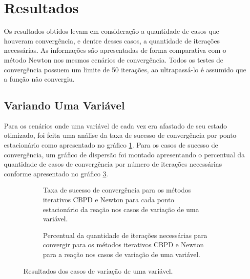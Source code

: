 \section{Resultados}
\label{sec:results}

Os resultados obtidos levam em consideração a quantidade de casos que houveram convergência, e dentre desses casos, a quantidade de iterações necessárias. As informações são apresentadas de forma comparativa com o método Newton nos mesmos cenários de convergência. Todos os testes de convergência possuem um limite de 50 iterações, ao ultrapassá-lo é assumido que a função não convergiu. 

\subsection{Variando Uma Variável}
\label{sec:res-one-var}

Para os cenários onde uma variável de cada vez era afastado de seu estado otimizado, foi feita uma análise da taxa de sucesso de convergência por ponto estacionário como apresentado no gráfico \ref{fig:result-one-var-conv-tax}. Para os casos de sucesso de convergência, um gráfico de dispersão foi montado apresentando o percentual da quantidade de casos de convergência por número de iterações necessárias conforme apresentado no gráfico \ref{fig:result-one-var-conv-metric}.

\begin{figure}[h]
  \begin{subfigure}{.5\textwidth}
    \begin{center}
      
    \end{center}
    \caption{Taxa de sucesso de convergência para os métodos iterativos CBPD e Newton para cada ponto estacionário da reação  nos casos de variação de uma variável.}
    \label{fig:result-one-var-conv-tax}
  \end{subfigure}%
  \begin{subfigure}{.5\textwidth}
    \begin{center}
      
    \end{center}
    \caption{Percentual da quantidade de iterações necessárias para convergir para os métodos iterativos CBPD e Newton para a reação  nos casos de variação de uma variável.}
    \label{fig:result-one-var-conv-metric}
  \end{subfigure}
  \caption{Resultados dos casos de variação de uma variável.}
\end{figure}

